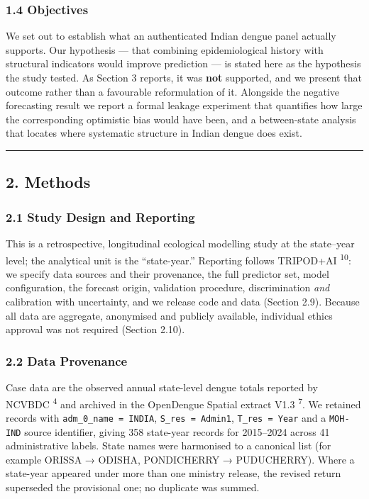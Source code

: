 \documentclass[
  10pt,
  twocolumn]{article}
\begin{document}
\subsubsection{1.4 Objectives}\label{objectives}

We set out to establish what an authenticated Indian dengue panel
actually supports. Our hypothesis --- that combining epidemiological
history with structural indicators would improve prediction --- is
stated here as the hypothesis the study tested. As Section 3 reports, it
was \textbf{not} supported, and we present that outcome rather than a
favourable reformulation of it. Alongside the negative forecasting
result we report a formal leakage experiment that quantifies how large
the corresponding optimistic bias would have been, and a between-state
analysis that locates where systematic structure in Indian dengue does
exist.

\begin{center}\rule{0.5\linewidth}{0.5pt}\end{center}

\subsection{2. Methods}\label{methods}

\subsubsection{2.1 Study Design and
Reporting}\label{study-design-and-reporting}

This is a retrospective, longitudinal ecological modelling study at the
state--year level; the analytical unit is the ``state-year.'' Reporting
follows TRIPOD+AI \textsuperscript{10}: we specify data sources and
their provenance, the full predictor set, model configuration, the
forecast origin, validation procedure, discrimination \emph{and}
calibration with uncertainty, and we release code and data (Section
2.9). Because all data are aggregate, anonymised and publicly available,
individual ethics approval was not required (Section 2.10).

\subsubsection{2.2 Data Provenance}\label{data-provenance}

Case data are the observed annual state-level dengue totals reported by
NCVBDC \textsuperscript{4} and archived in the OpenDengue Spatial
extract V1.3 \textsuperscript{7}. We retained records with
\texttt{adm\_0\_name\ =\ INDIA}, \texttt{S\_res\ =\ Admin1},
\texttt{T\_res\ =\ Year} and a \texttt{MOH-IND} source identifier,
giving 358 state-year records for 2015--2024 across 41 administrative
labels. State names were harmonised to a canonical list (for example
ORISSA → ODISHA, PONDICHERRY → PUDUCHERRY). Where a state-year appeared
under more than one ministry release, the revised return superseded the
provisional one; no duplicate was summed.
\end{document}
